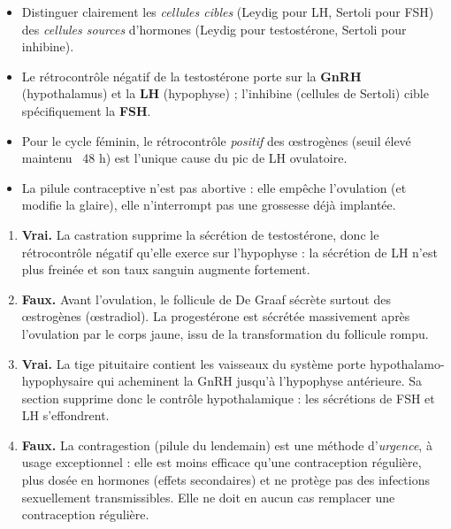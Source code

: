 \documentclass[11pt]{article}
\newcommand{\cle}[1]{{\popxbold\color{popdark}#1}}
\begin{document}
\begin{attention}
\begin{itemize}
\item Distinguer clairement les \emph{cellules cibles} (Leydig pour LH, Sertoli pour FSH) des \emph{cellules sources} d'hormones (Leydig pour testostérone, Sertoli pour inhibine).
\item Le rétrocontrôle négatif de la testostérone porte sur la \textbf{GnRH} (hypothalamus) et la \textbf{LH} (hypophyse) ; l'inhibine (cellules de Sertoli) cible spécifiquement la \textbf{FSH}.
\item Pour le cycle féminin, le rétrocontrôle \emph{positif} des œstrogènes (seuil élevé maintenu ~48 h) est l'unique cause du pic de LH ovulatoire.
\item La pilule contraceptive n'est pas abortive : elle empêche l'ovulation (et modifie la glaire), elle n'interrompt pas une grossesse déjà implantée.
\end{itemize}
\end{attention}

\begin{corrige}
\begin{enumerate}
\item \textbf{Vrai.} La castration supprime la sécrétion de testostérone, donc le rétrocontrôle négatif qu'elle exerce sur l'hypophyse : la sécrétion de \cle{LH} n'est plus freinée et son taux sanguin augmente fortement.
\item \textbf{Faux.} Avant l'ovulation, le follicule de De Graaf sécrète surtout des \cle{œstrogènes} (œstradiol). La \cle{progestérone} est sécrétée massivement après l'ovulation par le \cle{corps jaune}, issu de la transformation du follicule rompu.
\item \textbf{Vrai.} La tige pituitaire contient les vaisseaux du système porte hypothalamo-hypophysaire qui acheminent la \cle{GnRH} jusqu'à l'hypophyse antérieure. Sa section supprime donc le contrôle hypothalamique : les sécrétions de FSH et LH s'effondrent.
\item \textbf{Faux.} La contragestion (pilule du lendemain) est une méthode d'\emph{urgence}, à usage exceptionnel : elle est moins efficace qu'une contraception régulière, plus dosée en hormones (effets secondaires) et ne protège pas des infections sexuellement transmissibles. Elle ne doit en aucun cas remplacer une contraception régulière.
\end{enumerate}
\end{corrige}
\end{document}
